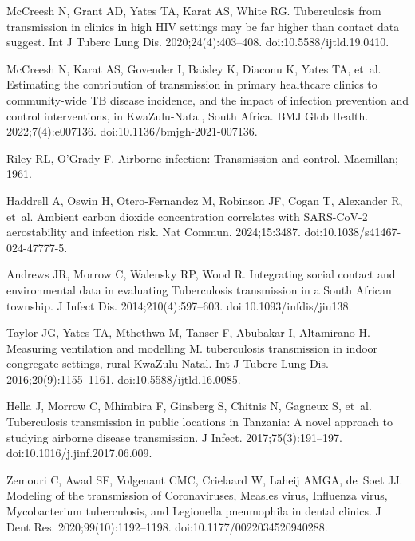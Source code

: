 \documentclass[fleqn,11pt]{wlscirep}
\begin{document}
\begin{thebibliography}{10}
McCreesh N, Grant AD, Yates TA, Karat AS, White RG.
\newblock Tuberculosis from transmission in clinics in high {HIV} settings may
  be far higher than contact data suggest.
\newblock Int J Tuberc Lung Dis. 2020;24(4):403--408.
\newblock doi:10.5588/ijtld.19.0410.

McCreesh N, Karat AS, Govender I, Baisley K, Diaconu K, Yates TA, et~al.
\newblock Estimating the contribution of transmission in primary healthcare
  clinics to community-wide {TB} disease incidence, and the impact of infection
  prevention and control interventions, in {KwaZulu}-{Natal}, {South} {Africa}.
\newblock BMJ Glob Health. 2022;7(4):e007136.
\newblock doi:10.1136/bmjgh-2021-007136.

Riley RL, O'Grady F.
\newblock Airborne {infection}: {Transmission} and {control}.
\newblock Macmillan; 1961.

Haddrell A, Oswin H, Otero-Fernandez M, Robinson JF, Cogan T, Alexander R,
  et~al.
\newblock Ambient carbon dioxide concentration correlates with {SARS}-{CoV}-2
  aerostability and infection risk.
\newblock Nat Commun. 2024;15:3487.
\newblock doi:10.1038/s41467-024-47777-5.

Andrews JR, Morrow C, Walensky RP, Wood R.
\newblock Integrating social contact and environmental data in evaluating
  {Tuberculosis} transmission in a {South} {African} township.
\newblock J Infect Dis. 2014;210(4):597--603.
\newblock doi:10.1093/infdis/jiu138.

Taylor JG, Yates TA, Mthethwa M, Tanser F, Abubakar I, Altamirano H.
\newblock Measuring ventilation and modelling {M}. tuberculosis transmission in
  indoor congregate settings, rural {KwaZulu}-{Natal}.
\newblock Int J Tuberc Lung Dis. 2016;20(9):1155--1161.
\newblock doi:10.5588/ijtld.16.0085.

Hella J, Morrow C, Mhimbira F, Ginsberg S, Chitnis N, Gagneux S, et~al.
\newblock Tuberculosis transmission in public locations in {Tanzania}: {A}
  novel approach to studying airborne disease transmission.
\newblock J Infect. 2017;75(3):191--197.
\newblock doi:10.1016/j.jinf.2017.06.009.

Zemouri C, Awad SF, Volgenant CMC, Crielaard W, Laheij AMGA, de~Soet JJ.
\newblock Modeling of the transmission of Coronaviruses, Measles virus,
  Influenza virus, Mycobacterium tuberculosis, and Legionella pneumophila in
  dental clinics.
\newblock J Dent Res. 2020;99(10):1192--1198.
\newblock doi:10.1177/0022034520940288.


\end{thebibliography}
\end{document}
